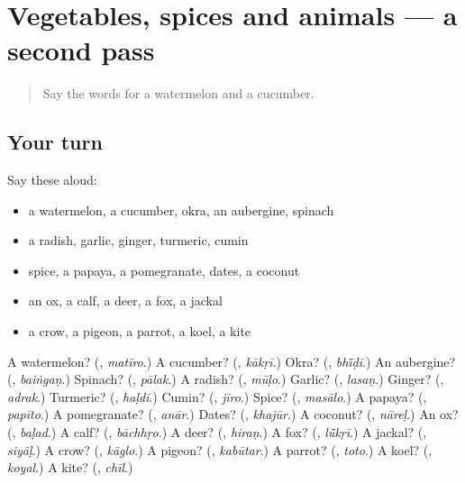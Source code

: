 \section[(dialogue)]{Vegetables, spices and animals — a second pass}

\label{lesson:MW-R139-second-pass-vegetables-spices-and-animals}



\begin{quote}
Say the words for a watermelon and a cucumber.
\end{quote}

\subsection*{Your turn}
Say these aloud:

\begin{itemize}
\raggedright
  \item a watermelon, a cucumber, okra, an aubergine, spinach
  \item a radish, garlic, ginger, turmeric, cumin
  \item spice, a papaya, a pomegranate, dates, a coconut
  \item an ox, a calf, a deer, a fox, a jackal
  \item a crow, a pigeon, a parrot, a koel, a kite
\end{itemize}

\begin{tcolorbox}[breakable,colback=teal!4,colframe=teal!35!black,title={Before you move on}]
A watermelon? (\textbf{}, \emph{matīro}.) A cucumber? (\textbf{}, \emph{kākṛī}.) Okra? (\textbf{}, \emph{bhī̃ḍī}.) An aubergine? (\textbf{}, \emph{baiṅgaṇ}.) Spinach? (\textbf{}, \emph{pālak}.) A radish? (\textbf{}, \emph{mūḷo}.) Garlic? (\textbf{}, \emph{lasaṇ}.) Ginger? (\textbf{}, \emph{adrak}.) Turmeric? (\textbf{}, \emph{haḷdī}.) Cumin? (\textbf{}, \emph{jīro}.) Spice? (\textbf{}, \emph{masālo}.) A papaya? (\textbf{}, \emph{papīto}.) A pomegranate? (\textbf{}, \emph{anār}.) Dates? (\textbf{}, \emph{khajūr}.) A coconut? (\textbf{}, \emph{nāreḷ}.) An ox? (\textbf{}, \emph{baḷad}.) A calf? (\textbf{}, \emph{bāchhṛo}.) A deer? (\textbf{}, \emph{hiraṇ}.) A fox? (\textbf{}, \emph{lū̃kṛī}.) A jackal? (\textbf{}, \emph{siyāḷ}.) A crow? (\textbf{}, \emph{kāglo}.) A pigeon? (\textbf{}, \emph{kabūtar}.) A parrot? (\textbf{}, \emph{toto}.) A koel? (\textbf{}, \emph{koyal}.) A kite? (\textbf{}, \emph{chīl}.)
\end{tcolorbox}
